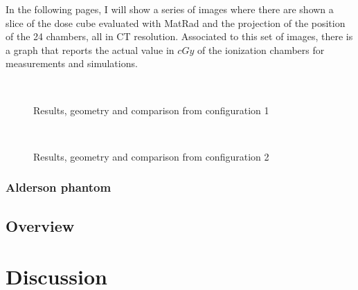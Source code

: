 \documentclass[12pt, a4paper, twoside]{book}
\begin{document}
In the following pages, I will show a series of images where there are shown a slice of the dose cube evaluated with MatRad and the projection of the position of the 24 chambers, all in CT resolution. Associated to this set of images, there is a graph that reports the actual value in $cGy$ of the ionization chambers for measurements and simulations.
\newpage
\begin{figure}[h!]
\centering
{} \quad
{} \\
 \quad
\caption{Results, geometry and comparison from configuration 1}
\label{fig:pos1}
\end{figure}

\newpage
\begin{figure}[h!]
\centering
{} \quad
{} \\
 \quad
\caption{Results, geometry and comparison from configuration 2}
\label{fig:pos2}
\end{figure}

\subsection{Alderson phantom}

\section{Overview} %


\chapter{Discussion} %
\end{document}
